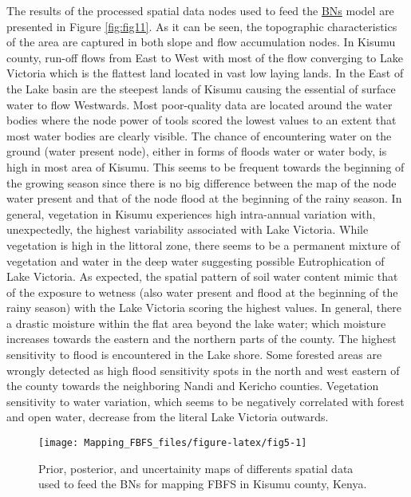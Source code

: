 \documentclass[12pt,oneside]{article}
\begin{document}
The results of the processed spatial data nodes used to feed the \href{https://en.wikipedia.org/wiki/Bayesian_network}{BNs} model are presented in Figure \ref{fig:fig11}. As it can be seen, the topographic characteristics of the area are captured in both slope and flow accumulation nodes. In Kisumu county, run-off flows from East to West with most of the flow converging to Lake Victoria which is the flattest land located in vast low laying lands. In the East of the Lake basin are the steepest lands of Kisumu causing the essential of surface water to flow Westwards. Most poor-quality data are located around the water bodies where the node power of tools scored the lowest values to an extent that most water bodies are clearly visible. The chance of encountering water on the ground (water present node), either in forms of floods water or water body, is high in most area of Kisumu. This seems to be frequent towards the beginning of the growing season since there is no big difference between the map of the node water present and that of the node flood at the beginning of the rainy season. In general, vegetation in Kisumu experiences high intra-annual variation with, unexpectedly, the highest variability associated with Lake Victoria. While vegetation is high in the littoral zone, there seems to be a permanent mixture of vegetation and water in the deep water suggesting possible Eutrophication of Lake Victoria. As expected, the spatial pattern of soil water content mimic that of the exposure to wetness (also water present and flood at the beginning of the rainy season) with the Lake Victoria scoring the highest values. In general, there a drastic moisture within the flat area beyond the lake water; which moisture increases towards the eastern and the northern parts of the county. The highest sensitivity to flood is encountered in the Lake shore. Some forested areas are wrongly detected as high flood sensitivity spots in the north and west eastern of the county towards the neighboring Nandi and Kericho counties. Vegetation sensitivity to water variation, which seems to be negatively correlated with forest and open water, decrease from the literal Lake Victoria outwards.

\begin{figure}[!htbp]

{\centering \texttt{[image: Mapping\_FBFS\_files/figure-latex/fig5-1]} 

}

\caption{Prior, posterior, and uncertainity maps of differents spatial data used to feed the BNs for mapping FBFS in Kisumu county, Kenya.}\label{fig:fig5}
\end{figure}
\end{document}
